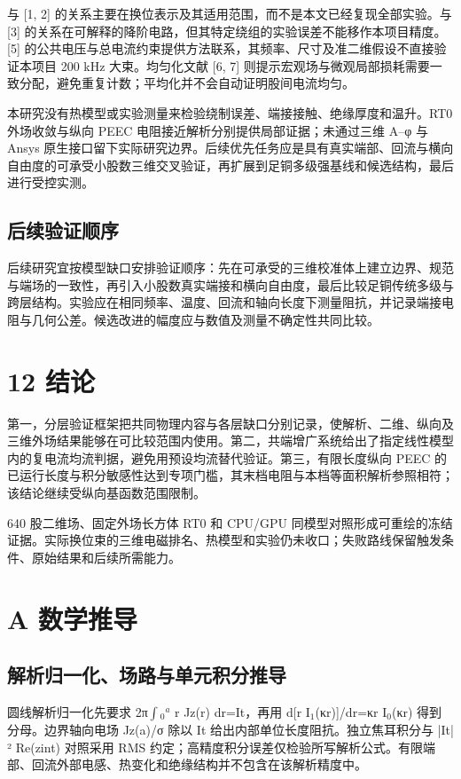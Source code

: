\documentclass[journal,10pt]{IEEEtran}
\begin{document}
与 [1, 2] 的关系主要在换位表示及其适用范围，而不是本文已经复现全部实验。与 [3] 的关系在可解释的降阶电路，但其特定绕组的实验误差不能移作本项目精度。[5] 的公共电压与总电流约束提供方法联系，其频率、尺寸及准二维假设不直接验证本项目 200 kHz 大束。均匀化文献 [6, 7] 则提示宏观场与微观局部损耗需要一致分配，避免重复计数；平均化并不会自动证明股间电流均匀。


本研究没有热模型或实验测量来检验绕制误差、端接接触、绝缘厚度和温升。RT0 外场收敛与纵向 PEEC 电阻接近解析分别提供局部证据；未通过三维 A–φ 与 Ansys 原生接口留下实际研究边界。后续优先任务应是具有真实端部、回流与横向自由度的可承受小股数三维交叉验证，再扩展到足铜多级强基线和候选结构，最后进行受控实测。


\subsection*{后续验证顺序}
\hypertarget{11.recommendations.heading}{}
后续研究宜按模型缺口安排验证顺序：先在可承受的三维校准体上建立边界、规范与端场的一致性，再引入小股数真实端接和横向自由度，最后比较足铜传统多级与跨层结构。实验应在相同频率、温度、回流和轴向长度下测量阻抗，并记录端接电阻与几何公差。候选改进的幅度应与数值及测量不确定性共同比较。


\FloatBarrier
\section*{12 结论}
\hypertarget{chapter-12}{}
第一，分层验证框架把共同物理内容与各层缺口分别记录，使解析、二维、纵向及三维外场结果能够在可比较范围内使用。第二，共端增广系统给出了指定线性模型内的复电流均流判据，避免用预设均流替代验证。第三，有限长度纵向 PEEC 的已运行长度与积分敏感性达到专项门槛，其末档电阻与本档等面积解析参照相符；该结论继续受纵向基函数范围限制。


640 股二维场、固定外场长方体 RT0 和 CPU/GPU 同模型对照形成可重绘的冻结证据。实际换位束的三维电磁排名、热模型和实验仍未收口；失败路线保留触发条件、原始结果和后续所需能力。


\FloatBarrier
\section*{A 数学推导}
\hypertarget{chapter-A}{}
\subsection*{解析归一化、场路与单元积分推导}
\hypertarget{A.report_derivation.heading}{}
圆线解析归一化先要求 2π\(\int\)\(_0\)\(^a\) r Jz(r) dr=It，再用 d[r I\(_1\)(κr)]/dr=κr I\(_0\)(κr) 得到分母。边界轴向电场 Jz(a)/σ 除以 It 给出内部单位长度阻抗。独立焦耳积分与 |It|² Re(zint) 对照采用 RMS 约定；高精度积分误差仅检验所写解析公式。有限端部、回流外部电感、热变化和绝缘结构并不包含在该解析精度中。
\end{document}
